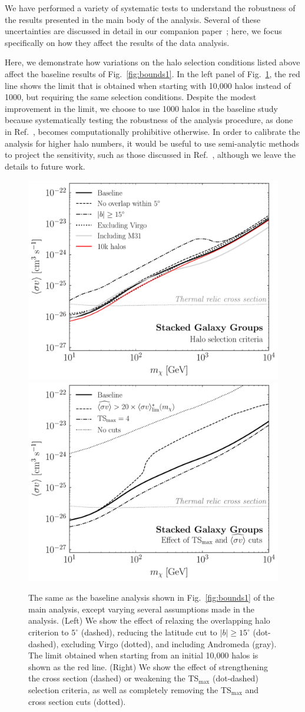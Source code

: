 We have performed a variety of systematic tests to understand the robustness of the results presented in the main body of the analysis.  Several of these uncertainties are discussed in detail in our companion paper~\cite{companion}; here, we focus specifically on how they affect the results of the data analysis.  \vspace{0.1in}

Here, we demonstrate how variations on the halo selection conditions listed above affect the baseline results of Fig.~\ref{fig:bounds1}.  In the left panel of Fig.~\ref{fig:cutsandhalos}, the red line shows the limit that is obtained when starting with 10,000 halos instead of 1000, but requiring the same selection conditions.  Despite the modest improvement in the limit, we choose to use 1000 halos in the baseline study because systematically testing the robustness of the analysis procedure, as done in Ref.~\cite{companion}, becomes computationally prohibitive otherwise. In order to calibrate the analysis for higher halo numbers, it would be useful to use semi-analytic methods to project the sensitivity, such as those discussed in Ref.~\cite{Cowan:2010js,Edwards:2017mnf}, although we leave the details to future work.

\begin{figure}[b]
  \centering
	\includegraphics[width=.45\textwidth]{ch-clusters/plots/systematics_nh.pdf} 
	\includegraphics[width=.45\textwidth]{ch-clusters/plots/systematics_cuts.pdf} 
  \caption{The same as the baseline analysis shown in Fig.~\ref{fig:bounds1} of the main analysis, except varying several assumptions made in the analysis.  (Left) We show the effect of relaxing the overlapping halo criterion to $5^\circ$ (dashed), reducing the latitude cut to $|b|\geq 15^\circ$ (dot-dashed), excluding Virgo (dotted), and including Andromeda (gray).  The limit obtained when starting from an initial 10,000 halos is shown as the red line.  (Right) We show the effect of strengthening the cross section (dashed) or weakening the TS$_\text{max}$ (dot-dashed) selection criteria, as well as completely removing the TS$_\text{max}$ and cross section cuts (dotted). }
  \label{fig:cutsandhalos}
\end{figure} 

